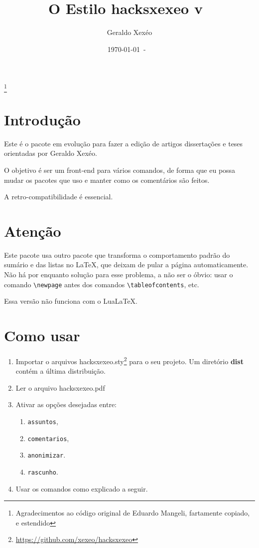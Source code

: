 \documentclass{article}
\title{O Estilo hacksxexeo v\ \hacksxexeoversion}
\author{Geraldo Xexéo}
\date{\today\ - \ \currenttime}
\begin{document}
\maketitle
\thanks{Agradecimentos ao código original de Eduardo Mangeli, fartamente copiado, e estendido}

\section{Introdução}

Este é o pacote em evolução para fazer a edição de artigos dissertações e teses orientadas por Geraldo Xexéo.

O objetivo é ser um front-end para vários comandos, de forma que eu possa mudar os pacotes que uso e manter como os comentários são feitos.

A retro-compatibilidade é essencial.

\section{Atenção}

Este pacote usa outro pacote que transforma o comportamento padrão do sumário e das listas no \LaTeX, que deixam de pular a página automaticamente. Não há por enquanto solução para esse problema, a não ser o óbvio: usar o comando \verb!\newpage! antes dos comandos \verb!\tableofcontents!, etc.

Essa versão não funciona com o Lua\LaTeX.

\section{Como usar}

\begin{enumerate}
    \item Importar o arquivos hacksxexeo.sty\footnote{\url{https://github.com/xexeo/hacksxexeo}} para o seu  projeto. Um diretório \textbf{dist} contém a última distribuição.
    \item Ler o arquivo hacksxexeo.pdf
    \item Ativar as opções desejadas entre:
    \begin{enumerate}
        \item \verb!assuntos!,
        \item \verb!comentarios!,
        \item \verb!anonimizar!.
        \item \verb!rascunho!.
    \end{enumerate}
    \item Usar os comandos como explicado a seguir.
\end{enumerate}
\end{document}
